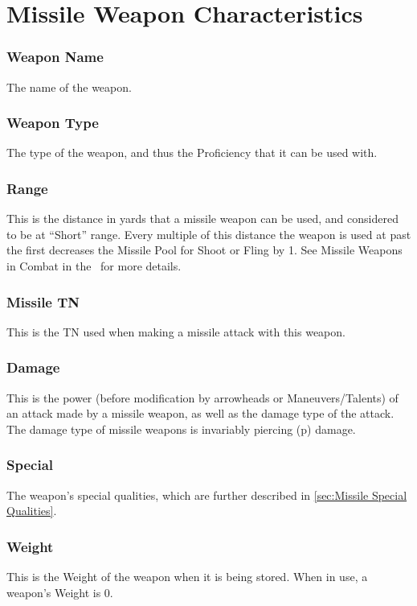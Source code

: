 \documentclass[oneside,11pt,english]{book}
\begin{document}
\section{Missile Weapon Characteristics}
\subsubsection{Weapon Name}
The name of the weapon.

\subsubsection{Weapon Type}
The type of the weapon, and thus the Proficiency that it can be used with. 

\subsubsection{Range}
This is the distance in yards that a missile weapon can be used, and considered to be at “Short” range. 
Every multiple of this distance the weapon is used at past the first decreases the Missile Pool for Shoot or 
Fling by 1. See Missile Weapons in Combat in the ~for more details.  %

\subsubsection{Missile TN}
This is the TN used when making a missile attack with this weapon.

\subsubsection{Damage}
This is the power (before modification by arrowheads or Maneuvers/Talents) of an attack made by a 
missile weapon, as well as the damage type of the attack. The damage type of missile weapons is 
invariably piercing (p) damage. 

\subsubsection{Special}
The weapon’s special qualities, which are further described in \autoref{sec:Missile Special Qualities}.

\subsubsection{Weight}
This is the Weight of the weapon when it is being stored. When in use, a weapon’s Weight is 0. 
\end{document}
